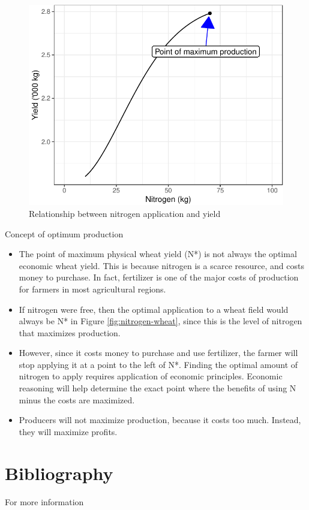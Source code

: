 \documentclass[12pt,ignorenonframetext,aspectratio=169]{beamer}
\providecommand{\tightlist}{%
  \setlength{\itemsep}{0pt}\setlength{\parskip}{0pt}}
\begin{document}
\begin{frame}{}
\protect\hypertarget{section-4}{}
\begin{figure}
\includegraphics[width=0.5\linewidth]{03-production_relationship_files/figure-beamer/nitrogen-wheat-optimum-production-1} \caption{Relationship between nitrogen application and yield}\label{fig:nitrogen-wheat-optimum-production}
\end{figure}
\end{frame}

\begin{frame}{Concept of optimum production}
\protect\hypertarget{concept-of-optimum-production}{}
\begin{itemize}
\tightlist
\item
  The point of maximum physical wheat yield (N*) is not always the
  optimal economic wheat yield. This is because nitrogen is a scarce
  resource, and costs money to purchase. In fact, fertilizer is one of
  the major costs of production for farmers in most agricultural
  regions.
\item
  If nitrogen were free, then the optimal application to a wheat field
  would always be N* in Figure \ref{fig:nitrogen-wheat}, since this is
  the level of nitrogen that maximizes production.
\item
  However, since it costs money to purchase and use fertilizer, the
  farmer will stop applying it at a point to the left of N*. Finding the
  optimal amount of nitrogen to apply requires application of economic
  principles. Economic reasoning will help determine the exact point
  where the benefits of using N minus the costs are maximized.
\item
  Producers will not maximize production, because it costs too much.
  Instead, they will maximize profits.
\end{itemize}
\end{frame}

\hypertarget{bibliography}{%
\section{Bibliography}\label{bibliography}}

\begin{frame}{For more information}
\protect\hypertarget{for-more-information}{}
\end{frame}
\end{document}
